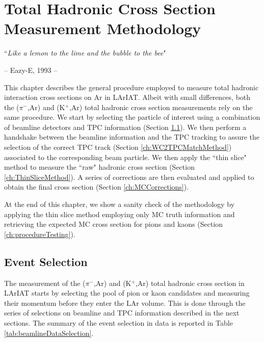 \chapter{Total Hadronic Cross Section Measurement Methodology}\label{ch:Interactions}
{\raggedleft ``\emph{Like a lemon to the lime and the bubble to the bee}" \par}
{\raggedleft -- Eazy-E,   1993 -- \par}%
\vspace{0.5cm}

This chapter describes the general procedure employed to measure  total hadronic interaction cross sections on Ar in LArIAT.
Albeit with small differences, both the  ($\pi^{-}$,Ar) and (K$^{+}$,Ar) total hadronic cross section measurements rely on the same procedure. We start by selecting the particle of interest using a combination of beamline detectors and TPC information (Section \ref{ch:ParticleSelectionMethod}). We then perform a handshake between the beamline information and the TPC tracking to assure the selection of the correct TPC track (Section \ref{ch:WC2TPCMatchMethod}) associated to the corresponding beam particle. We then apply the ``thin slice" method to measure the ``raw" hadronic cross section (Section \ref{ch:ThinSliceMethod}). A series of corrections are then evaluated and applied to obtain the final cross section (Section \ref{ch:MCCorrections}). 

At the end of this chapter, we show a sanity check of the methodology by applying the thin slice method employing only MC truth information and retrieving the expected MC cross section for pions and kaons (Section \ref{ch:procedureTesting}).



\section{Event Selection}\label{ch:ParticleSelectionMethod}
The measurement of the ($\pi^{-}$,Ar) and (K$^{+}$,Ar) total hadronic cross section in LArIAT starts by selecting the pool of pion or kaon candidates and measuring their momentum before they enter the LAr volume.  This is done through the series of selections on  beamline and TPC information described in the next sections. The summary of the event selection in data is reported in Table \ref{tab:beamlineDataSelection}.


